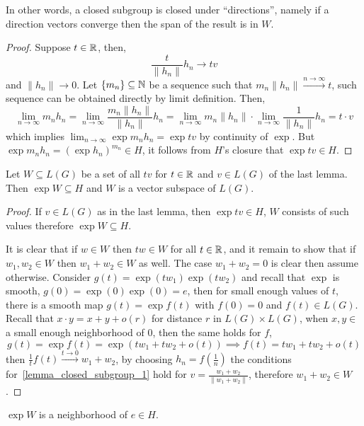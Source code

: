 In other words, a closed subgroup is closed under ``directions'', namely if a direction vectors converge then the span of the result is in $W$.
\begin{proof}
	Suppose $t \in \mathbb{R}$, then,
	\[
		\frac{t}{\lVert h_n \rVert} h_n
		\to t v
	\]
	and $\lVert h_n \rVert \to 0$.
	Let $\{ m_n \} \subseteq \mathbb{N}$ be a sequence such that $m_n \lVert h_n \rVert \xrightarrow{n \to \infty} t$, such sequence can be obtained directly by limit definition.
	Then,
	\[
		\lim_{n \to \infty} m_n h_n
		= \lim_{n \to \infty} \frac{m_n \lVert h_n \rVert}{\lVert h_n \rVert} h_n
		= \lim_{n \to \infty} m_n \lVert h_n \rVert \cdot \lim_{n \to \infty} \frac{1}{\lVert h_n \rVert} h_n
		= t \cdot v
	\]
	which implies $\lim_{n \to \infty} \exp m_n h_n = \exp t v$ by continuity of $\exp$.
	But $\exp m_n h_n = {(\exp h_n)}^{m_n} \in H$, it follows from $H$'s closure that $\exp tv \in H$.
\end{proof}
\begin{lemma}\label{lemma_closed_subgroup_2}
	Let $W \subseteq L(G)$ be a set of all $t v$ for $t \in \mathbb{R}$ and $v \in L(G)$ of the last lemma.
	Then $\exp W \subseteq H$ and $W$ is a vector subspace of $L(G)$.
\end{lemma}
\begin{proof}
	If $v \in L(G)$ as in the last lemma, then $\exp t v \in H$, $W$ consists of such values therefore $\exp W \subseteq H$.

	It is clear that if $w \in W$ then $t w \in W$ for all $t \in \mathbb{R}$, and it remain to show that if $w_1, w_2 \in W$ then $w_1 + w_2 \in W$ as well.
	The case $w_1 + w_2 = 0$ is clear then assume otherwise.
	Consider $g(t) = \exp(t w_1) \exp(t w_2)$ and recall that $\exp$ is smooth, $g(0) = \exp(0) \exp(0) = e$,
	then for small enough values of $t$, there is a smooth map $g(t) = \exp f(t)$ with $f(0) = 0$ and $f(t) \in L(G)$. \\
	Recall that $x \cdot y = x + y + o(r)$ for distance $r$ in $L(G) \times L(G)$, when $x, y \in $ a small enough neighborhood of $0$, then the same holds for $f$,
	\[
		g(t)
		= \exp f(t)
		= \exp(t w_1 + t w_2 + o(t))
		\implies f(t)
		= t w_1 + t w_2 + o(t)
	\]
	then $\frac{1}{t} f(t) \xrightarrow{t \to 0} w_1 + w_2$, by choosing $h_n = f(\frac{1}{n})$ the conditions for\ \ref{lemma_closed_subgroup_1} hold for $v = \frac{w_1 + w_2}{\lVert w_1 + w_2 \rVert}$,
	therefore $w_1 + w_2 \in W$.
\end{proof}
\begin{lemma}
	$\exp W$ is a neighborhood of $e \in H$.
\end{lemma}
